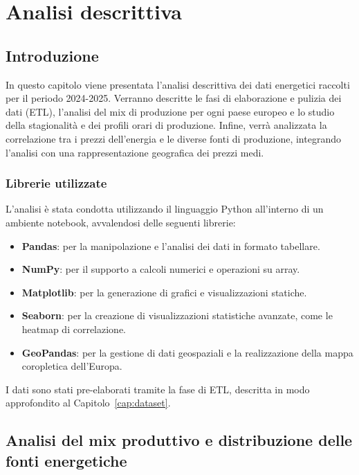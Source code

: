 \chapter{Analisi descrittiva} %

\section{Introduzione}

In questo capitolo viene presentata l'analisi descrittiva dei dati energetici raccolti per il periodo 2024-2025. Verranno descritte le fasi di elaborazione e pulizia dei dati (ETL), l'analisi del mix di produzione per ogni paese europeo e lo studio della stagionalità e dei profili orari di produzione. Infine, verrà analizzata la correlazione tra i prezzi dell'energia e le diverse fonti di produzione, integrando l'analisi con una rappresentazione geografica dei prezzi medi.

\subsection{Librerie utilizzate}

L'analisi è stata condotta utilizzando il linguaggio Python all'interno di un ambiente notebook, avvalendosi delle seguenti librerie:

\begin{itemize}
    \item \textbf{Pandas}: per la manipolazione e l'analisi dei dati in formato tabellare.
    \item \textbf{NumPy}: per il supporto a calcoli numerici e operazioni su array.
    \item \textbf{Matplotlib}: per la generazione di grafici e visualizzazioni statiche.
    \item \textbf{Seaborn}: per la creazione di visualizzazioni statistiche avanzate, come le heatmap di correlazione.
    \item \textbf{GeoPandas}: per la gestione di dati geospaziali e la realizzazione della mappa coropletica dell'Europa.
\end{itemize}

I dati sono stati pre-elaborati tramite la fase di ETL, descritta in modo approfondito al Capitolo~\ref{cap:dataset}.

\newpage

\section{Analisi del mix produttivo e distribuzione delle fonti energetiche}


